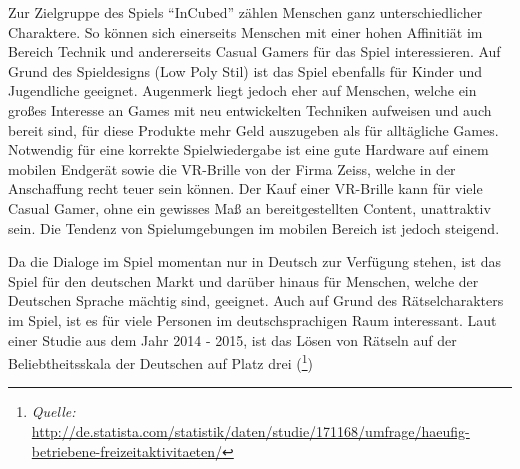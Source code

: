 
Zur Zielgruppe des Spiels “InCubed” zählen Menschen ganz unterschiedlicher Charaktere. So können sich einerseits Menschen mit einer hohen Affinitiät im Bereich Technik und andererseits Casual Gamers für das Spiel interessieren. Auf Grund des Spieldesigns (Low Poly Stil) ist das Spiel ebenfalls für Kinder und Jugendliche geeignet. Augenmerk liegt jedoch eher auf Menschen, welche ein großes Interesse an Games mit neu entwickelten Techniken aufweisen und auch bereit sind, für diese Produkte mehr Geld auszugeben als für alltägliche Games. Notwendig für eine korrekte Spielwiedergabe ist eine gute Hardware auf einem mobilen Endgerät sowie die VR-Brille von der Firma Zeiss, welche in der Anschaffung recht teuer sein können. Der Kauf einer VR-Brille kann für viele Casual Gamer, ohne ein gewisses Maß an bereitgestellten Content, unattraktiv sein. Die Tendenz von Spielumgebungen im mobilen Bereich ist jedoch steigend.

Da die Dialoge im Spiel momentan nur in Deutsch zur Verfügung stehen, ist das Spiel für den deutschen Markt und darüber hinaus für Menschen, welche der Deutschen Sprache mächtig sind, geeignet. Auch auf Grund des Rätselcharakters im Spiel, ist es für viele Personen im deutschsprachigen Raum interessant. Laut einer Studie aus dem Jahr 2014 - 2015, ist das Lösen von Rätseln auf der Beliebtheitsskala der Deutschen auf Platz drei (\footnote{\textit{Quelle:} \url{http://de.statista.com/statistik/daten/studie/171168/umfrage/haeufig-betriebene-freizeitaktivitaeten/}})
